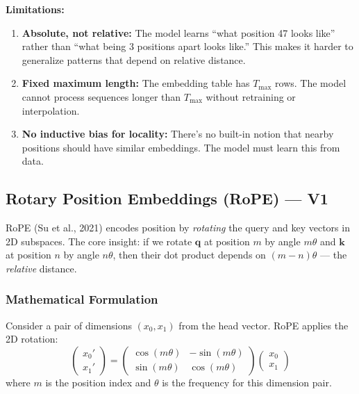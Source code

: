 \documentclass[11pt, a4paper]{article}
\theoremstyle{definition}
\newcommand{\vq}{\bm{q}}
\newcommand{\vk}{\bm{k}}
\begin{document}
\textbf{Limitations:}
\begin{enumerate}
    \item \textbf{Absolute, not relative:} The model learns ``what position 47 looks like'' rather than ``what being 3 positions apart looks like.'' This makes it harder to generalize patterns that depend on relative distance.
    \item \textbf{Fixed maximum length:} The embedding table has $T_{\max}$ rows. The model cannot process sequences longer than $T_{\max}$ without retraining or interpolation.
    \item \textbf{No inductive bias for locality:} There's no built-in notion that nearby positions should have similar embeddings. The model must learn this from data.
\end{enumerate}

\subsection{Rotary Position Embeddings (RoPE) — V1}

RoPE (Su et al., 2021) encodes position by \emph{rotating} the query and key vectors in 2D subspaces. The core insight: if we rotate $\vq$ at position $m$ by angle $m\theta$ and $\vk$ at position $n$ by angle $n\theta$, then their dot product depends on $(m-n)\theta$ — the \emph{relative} distance.

\subsubsection{Mathematical Formulation}

Consider a pair of dimensions $(x_0, x_1)$ from the head vector. RoPE applies the 2D rotation:
\begin{equation}\label{eq:rope_rotation}
    \begin{pmatrix} x_0' \\ x_1' \end{pmatrix} = \begin{pmatrix} \cos(m\theta) & -\sin(m\theta) \\ \sin(m\theta) & \cos(m\theta) \end{pmatrix} \begin{pmatrix} x_0 \\ x_1 \end{pmatrix}
\end{equation}
where $m$ is the position index and $\theta$ is the frequency for this dimension pair.
\end{document}
